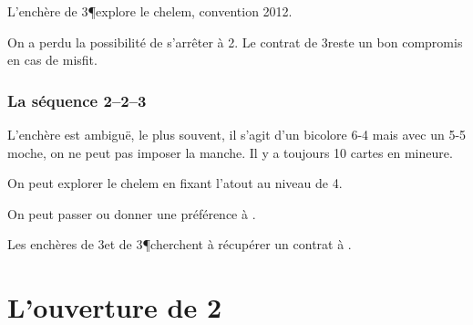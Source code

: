 \begin{multicols}{2}
 L'enchère de 3\P explore le chelem, convention 2012.

 On a perdu la possibilité de s'arrêter à 2\NT. Le contrat de 3\K reste un bon compromis en cas de misfit.

 \subsection*{ La séquence 2\K--2\C--3\T}

 L'enchère est ambiguë, le plus souvent, il s'agit d'un bicolore 6-4 mais avec un 5-5 moche, on ne peut pas imposer la manche. Il y a toujours 10 cartes en mineure.

 On peut explorer le chelem en fixant l'atout au niveau de 4.

 On peut passer ou donner une préférence à \K.

 Les enchères de 3\C et de 3\P cherchent à récupérer un contrat à \NT.

\end{multicols}%

\chapter{L'ouverture de 2\T}

